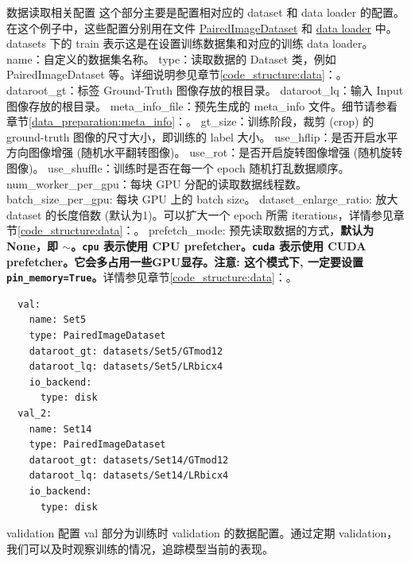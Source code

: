 \documentclass[../main.tex]{subfiles}
\begin{document}
\begin{exampleBox}[righthand ratio=0.00, sidebyside, sidebyside align=center, lower separated=false]{数据读取相关配置}
这个部分主要是配置相对应的 dataset 和 data loader 的配置。在这个例子中，这些配置分别用在文件 \href{https://github.com/XPixelGroup/BasicSR/blob/master/basicsr/data/paired_image_dataset.py}{PairedImageDataset} 和 \href{https://github.com/XPixelGroup/BasicSR/blob/master/basicsr/data/__init__.py}{data loader} 中。
datasets 下的 train 表示这是在设置训练数据集和对应的训练 data loader。
name：自定义的数据集名称。
type：读取数据的 Dataset 类，例如 PairedImageDataset 等。详细说明参见章节\ref{code_structure:data}：。
dataroot\_gt：标签 Ground-Truth 图像存放的根目录。
dataroot\_lq：输入 Input 图像存放的根目录。
meta\_info\_file：预先生成的 meta\_info 文件。细节请参看章节\ref{data_preparation:meta_info}：。
gt\_size：训练阶段，裁剪 (crop) 的 ground-truth 图像的尺寸大小，即训练的 label 大小。
use\_hflip：是否开启水平方向图像增强 (随机水平翻转图像)。
use\_rot：是否开启旋转图像增强 (随机旋转图像)。
use\_shuffle：训练时是否在每一个 epoch 随机打乱数据顺序。
num\_worker\_per\_gpu：每块 GPU 分配的读取数据线程数。
batch\_size\_per\_gpu: 每块 GPU 上的 batch size。
dataset\_enlarge\_ratio: 放大 dataset 的长度倍数 (默认为1)。可以扩大一个 epoch 所需 iterations，详情参见章节\ref{code_structure:data}：。
prefetch\_mode: 预先读取数据的方式，\textbf{默认为 None，即 $\sim$。\texttt{cpu} 表示使用 CPU prefetcher。\texttt{cuda} 表示使用 CUDA prefetcher。它会多占用一些GPU显存。注意: 这个模式下, 一定要设置 \texttt{pin\_memory=True}。}详情参见章节\ref{code_structure:data}：。
\end{exampleBox}
\begin{verbatim}
  val:
    name: Set5
    type: PairedImageDataset
    dataroot_gt: datasets/Set5/GTmod12
    dataroot_lq: datasets/Set5/LRbicx4
    io_backend:
      type: disk
  val_2:
    name: Set14
    type: PairedImageDataset
    dataroot_gt: datasets/Set14/GTmod12
    dataroot_lq: datasets/Set14/LRbicx4
    io_backend:
      type: disk
\end{verbatim}
\begin{exampleBox}[righthand ratio=0.00, sidebyside, sidebyside align=center, lower separated=false]{validation 配置}
val 部分为训练时 validation 的数据配置。通过定期 validation，我们可以及时观察训练的情况，追踪模型当前的表现。
\end{exampleBox}
\end{document}
